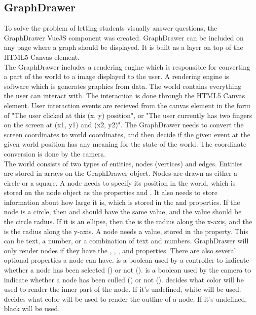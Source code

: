 \subsection{GraphDrawer}
To solve the problem of letting students visually answer questions, the GraphDrawer VueJS component was created. GraphDrawer can be included on any page where a graph should be displayed. It is built as a layer on top of the HTML5 Canvas element.
\\[11pt]
The GraphDrawer includes a rendering engine which is responsible for converting a part of the world to a image displayed to the user. A rendering engine is software which is generates graphics from data. The world contains everything the user can interact with. The interaction is done through the HTML5 Canvas element. User interaction events are recieved from the canvas element in the form of "The user clicked at this (x, y) position", or "The user currently has two fingers on the screen at (x1, y1) and (x2, y2)". The GraphDrawer needs to convert the screen coordinates to world coordinates, and then decide if the given event at the given world position has any meaning for the state of the world. The coordinate conversion is done by the camera.
\\[11pt]
The world consists of two types of entities, nodes (vertices) and edges. Entities are stored in arrays on the GraphDrawer object. Nodes are drawn as either a circle or a square. A node needs to specify its position in the world, which is stored on the node object as the properties  and . It also needs to store information about how large it is, which is stored in the  and  properties. If the node is a circle, then  and  should have the same value, and the value should be the circle radius. If it is an ellipse, then the  is the radius along the x-axis, and the  is the radius along the y-axis. A node needs a value, stored in the  property. This can be text, a number, or a combination of text and numbers. GraphDrawer will only render nodes if they have the , , ,  and  properties. There are also several optional properties a node can have.  is a boolean used by a controller to indicate whether a node has been selected () or not ().  is a boolean used by the camera to indicate whether a node has been culled () or not ().  decides what color will be used to render the inner part of the node. If it's undefined, white will be used.  decides  what color will be used to render the outline of a node. If it's undefined, black will be used.
